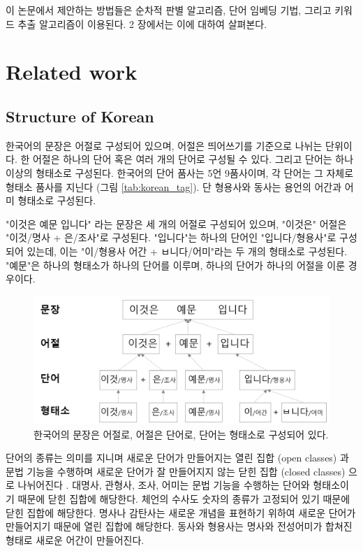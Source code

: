 \documentclass[11pt]{article}
\begin{document}
이 논문에서 제안하는 방법들은 순차적 판별 알고리즘, 단어 임베딩 기법, 그리고 키워드 추출 알고리즘이 이용된다.
2 장에서는 이에 대하여 살펴본다.

\newpage
\section{Related work}

\subsection{Structure of Korean}

한국어의 문장은 어절로 구성되어 있으며, 어절은 띄어쓰기를 기준으로 나뉘는 단위이다.
한 어절은 하나의 단어 혹은 여러 개의 단어로 구성될 수 있다.
그리고 단어는 하나 이상의 형태소로 구성된다.
한국어의 단어 품사는 5언 9품사이며, 각 단어는 그 자체로 형태소 품사를 지닌다 (그림 \ref{tab:korean_tag}).
단 형용사와 동사는 용언의 어간과 어미 형태소로 구성된다.

"이것은 예문 입니다" 라는 문장은 세 개의 어절로 구성되어 있으며, "이것은" 어절은 "이것/명사 + 은/조사"로 구성된다.
"입니다"는 하나의 단어인 "입니다/형용사"로 구성되어 있는데, 이는 "이/형용사 어간 + ㅂ니다/어미"라는 두 개의 형태소로 구성된다.
"예문"은 하나의 형태소가 하나의 단어를 이루며, 하나의 단어가 하나의 어절을 이룬 경우이다.

\begin{figure}[H]
\centering
\includegraphics[keepaspectratio=true, width=0.6\linewidth]{figures/korean_structure.png}
\caption{한국어의 문장은 어절로, 어절은 단어로, 단어는 형태소로 구성되어 있다.}
\label{fig:korean_structure}
\end{figure}

단어의 종류는 의미를 지니며 새로운 단어가 만들어지는 열린 집합 (open classes) 과 문법 기능을 수행하며 새로운 단어가 잘 만들어지지 않는 닫힌 집합 (closed classes) 으로 나뉘어진다 \citep{jurafsky2000speech}.
대명사, 관형사, 조사, 어미는 문법 기능을 수행하는 단어와 형태소이기 때문에 닫힌 집합에 해당한다.
체언의 수사도 숫자의 종류가 고정되어 있기 때문에 닫힌 집합에 해당한다.
명사나 감탄사는 새로운 개념을 표현하기 위하여 새로운 단어가 만들어지기 때문에 열린 집합에 해당한다.
동사와 형용사는 명사와 전성어미가 합쳐진 형태로 새로운 어간이 만들어진다.
\end{document}

